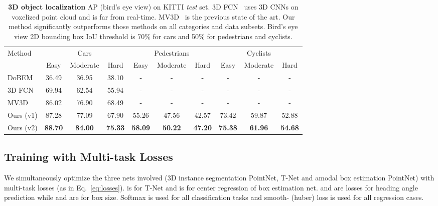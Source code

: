 \documentclass[10pt,twocolumn,letterpaper]{article}
\begin{document}
\begin{table*}[t!]
\small
\centering
\begin{tabular}{l||ccc||ccc||ccc}
\hline
\multirow{2}{*}{Method} & \multicolumn{3}{c||}{Cars} & \multicolumn{3}{c||}{Pedestrians} & \multicolumn{3}{c}{Cyclists} \\ \cline{2-10} 
                        & Easy  & Moderate  & Hard  & Easy     & Moderate    & Hard    & Easy    & Moderate   & Hard   \\ \hline
DoBEM~\cite{yuvehicle} & 36.49 & 36.95 & 38.10 & - & - & - & - & - & - \\
3D FCN~\cite{li20163d} & 69.94 & 62.54 & 55.94 & - & - & - & - & - & - \\
MV3D~\cite{cvpr17chen} & 86.02 & 76.90 & 68.49 & - & - & - & - & - & - \\ \hline
Ours (v1) & 87.28 & 77.09 & 67.90 & 55.26 & 47.56 & 42.57 & 73.42 & 59.87 & 52.88 \\
Ours (v2) & \textbf{88.70} & \textbf{84.00} & \textbf{75.33} & \textbf{58.09} & \textbf{50.22} & \textbf{47.20} & \textbf{75.38} & \textbf{61.96} & \textbf{54.68} \\ \hline
\end{tabular}
\caption{\textbf{3D object localization} AP (bird's eye view) on KITTI \emph{test} set.
3D FCN~\cite{li20163d} uses 3D CNNs on voxelized point cloud and is far from real-time. MV3D~\cite{cvpr17chen} is the previous state of the art.
Our method significantly outperforms those methods on all categories and data subsets. Bird's eye view 2D bounding box IoU threshold is 70\% for cars and 50\% for pedestrians and cyclists.}
\label{tab:kitti_test_3d_localization}

\end{table*}

\subsection{Training with Multi-task Losses}
\label{sec:losses}

We simultaneously optimize the three nets involved (3D instance segmentation PointNet, T-Net and amodal box estimation PointNet) with multi-task losses (as in Eq.~\ref{eq:losses}).
 is for T-Net and  is for center regression of box estimation net.  and  are losses for heading angle prediction while  and  are for box size.
Softmax is used for all classification tasks and smooth- (huber) loss is used for all regression cases.

\vspace{-1mm}
\end{document}
